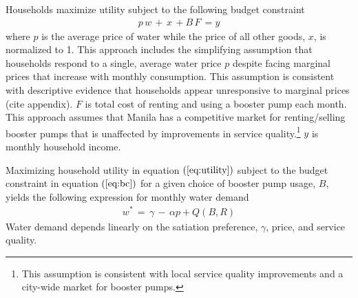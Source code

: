 \documentclass[12pt,table]{article}
\begin{document}

Households maximize utility subject to the following budget constraint
\begin{align}
\label{eq:bc}
p\,w \,+\, x \, +  B \, F \, = y 
\end{align}
where $p$ is the average price of water while the price of all other goods, $x$, is normalized to 1.  This approach includes the simplifying assumption that households respond to a single, average water price $p$ despite facing marginal prices that increase with monthly consumption.  This assumption is consistent with descriptive evidence that households appear unresponsive to marginal prices (cite appendix).   $F$ is total cost of renting and using a booster pump each month.  This approach assumes that Manila has a competitive market for renting/selling booster pumps that is unaffected by improvements in service quality.\footnote{This assumption is consistent with local service quality improvements and a city-wide market for booster pumps.}  $y$ is monthly household income.  



Maximizing household utility in equation $(\ref{eq:utility})$ subject to the budget constraint in equation $(\ref{eq:bc})$ for a given choice of booster pump usage, $B$, yields the following expression for monthly water demand
\begin{align}
\label{eq:demand}
w^{*} \, = \, \gamma \, - \, \alpha p +  Q(B,R)
\end{align}
Water demand depends linearly on the satiation preference, $\gamma$, price, and service quality.
\end{document}
